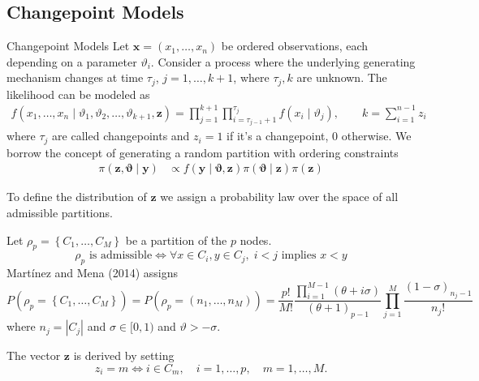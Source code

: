\subsection{Changepoint Models}
\begin{frame}{Changepoint Models}
    Let $\bm{x}=(x_{1},\ldots,x_{n})$ be \alert{ordered} observations, each depending on a parameter $\vartheta_{i}$.
    Consider a process where the underlying generating mechanism changes at time $\tau_{j}$, $j=1,\ldots,k+1$, where $\tau_{j},k$ are unknown. The likelihood can be modeled as
    \begin{align*}
        f(x_{1},\ldots,x_{n} \mid \vartheta_1, \vartheta_2, \ldots, \vartheta_{k+1}, \bm{z})=\prod_{j=1}^{k+1} \prod_{i=\tau_{j-1}+1}^{\tau_j} f(x_i \mid \vartheta_j),
        \qquad
        k=\sum_{i=1}^{n-1} z_i
    \end{align*}
    where $\tau_j$ are called \alert{changepoints} and $z_{i} = 1$ if it's a changepoint, $0$ otherwise.
    We borrow the concept of \alert{generating a random partition with ordering constraints}
    \begin{align*}
        \pi(\bm{z}, \bm{\vartheta} \mid \bm{y}) & \propto f(\bm{y} \mid \bm{\vartheta}, \bm{z}) \pi(\bm{\vartheta} \mid \bm{z}) \pi(\bm{z})
    \end{align*}
\end{frame}


\begin{frame}
To define the distribution of $\bm{z}$ we assign a probability law over the space of all \alert{admissible} partitions.

\pause

Let $\rho_p=\left\{C_1, \ldots, C_M\right\}$ be a partition of the $p$ nodes.
\[
    \rho_p \text{ is admissible} \iff \forall x \in C_i, y \in C_{j}, \; i<j \text{ implies } x < y
\]
Martínez and Mena (2014) assigns
\[
P\left(\rho_p=\left\{C_1, \ldots, C_M\right\}\right)=P\left(\rho_p=\left(n_1, \ldots, n_M\right)\right)=\frac{p !}{M !} \frac{\prod_{i=1}^{M-1}(\theta+i \sigma)}{(\theta+1)_{p-1}} \prod_{j=1}^M \frac{(1-\sigma)_{n_j-1}}{n_{j} !}
\]
where $n_j=\left|C_j\right|$ and $\sigma\in [0,1)$ and $\vartheta>-\sigma$.

The vector $\bm{z}$ is derived by setting
\[
z_i=m \Longleftrightarrow i \in C_m, \quad i=1, \ldots, p, \quad m=1, \ldots, M.
\]
\end{frame}







